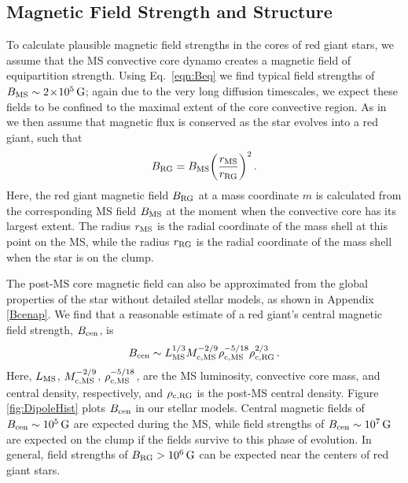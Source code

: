 \subsection{Magnetic Field Strength and Structure}
\label{fieldstruc}

To calculate plausible magnetic field strengths in the cores of red giant stars, we assume that the MS convective core dynamo creates a magnetic field of equipartition strength.
Using Eq.~\ref{eqn:Beq} we find typical field strengths of $B_{\rm MS} \sim 2 \! \times \! 10^5 \, {\rm G}$; again due to the very long diffusion timescales, we expect these fields to be confined to the maximal extent of the core convective region. As in \citet{Fuller_2015} we then assume that magnetic flux is conserved as the star evolves into a red giant, such that
\begin{equation}
\label{eqn:Brgb}
B_{\rm RG} = B_{\rm MS} \bigg( \frac{r_{\rm MS}}{r_{\rm RG}} \bigg)^2 \, .
\end{equation}
Here, the red giant magnetic field $B_{\rm RG}$ at a mass coordinate $m$ is calculated from the corresponding MS field $B_{\rm MS}$ at the moment when the convective core has its largest extent. The radius $r_{\rm MS}$ is the radial coordinate of the mass shell at this point on the MS, while the radius $r_{\rm RG}$ is the radial coordinate of the mass shell when the star is on the clump. 

The post-MS core magnetic field can also be approximated from the global properties of the star without detailed stellar models, as shown in Appendix \ref{Bcenap}. We find that a reasonable estimate of a red giant's central magnetic field strength, $B_{\rm cen}$, is
\begin{equation}
\label{eqn:Bcen}
B_{\rm cen} \sim L_{\rm MS}^{1/3} M_{\rm c,MS}^{-2/9} \rho_{\rm c,MS}^{-5/18} \rho_{\rm c,RG}^{2/3} \, .
\end{equation}
Here, $L_{\rm MS}$, $M_{\rm c,MS}^{-2/9}$, $\rho_{\rm c,MS}^{-5/18}$, are the MS luminosity, convective core mass, and central density, respectively, and $\rho_{\rm c,RG}$ is the post-MS central density. Figure \ref{fig:DipoleHist} plots $B_{\rm cen}$ in our stellar models. Central magnetic fields of $B_{\rm cen} \sim 10^5 \, {\rm G}$ are expected during the MS, while field strengths of $B_{\rm cen} \sim 10^7 \, {\rm G}$ are expected on the clump if the fields survive to this phase of evolution. In general, field strengths of $B_{\rm RG} > 10^6 \, {\rm G}$ can be expected near the centers of red giant stars.

